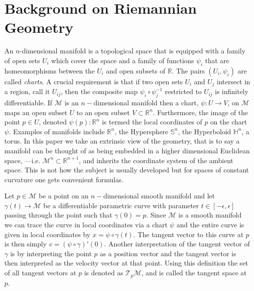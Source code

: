 \appendix
\onecolumn
\section{Background on Riemannian Geometry}
\label{riemannian_geometry_appendix}
An $n$-dimensional manifold is a topological space that is equipped with a family of open sets $U_i$ which cover the space and a family of functions $\psi_i$ that are homeomorphisms between the $U_i$ and open subsets of $\mathbb{R}$.  The pairs $(U_i,\psi_i)$ are called \emph{charts}.  A crucial requirement is that if two open sets $U_i$ and $U_j$ intersect in a region, call it $U_{ij}$, then the composite map $\psi_i\circ \psi_j^{-1}$ restricted to $U_{ij}$ is infinitely differentiable. If $\mathcal{M}$ is an $n-$dimensional manifold then a chart, $\psi: U \to V$, on $\mathcal{M}$ maps an open subset $U$ to an open subset $V \subset \mathbb{R}^n$. Furthermore, the image of the point $p \in U$, denoted $\psi(p) : \mathbb{R}^n$ is termed the local coordinates of $p$ on the chart $\psi$. Examples of manifolds include $\mathbb{R}^n$, the Hypersphere $\mathbb{S}^n$, the Hyperboloid $\mathbb{H}^n$, a torus. In this paper we take an extrinsic view of the geometry, that is to say a manifold can be thought of as being embedded in a higher dimensional Euclidean space, ---i.e. $\mathcal{M}^n \subset \mathbb{R}^{n+1}$, and inherits the coordinate system of the ambient space. This is not how the subject is usually developed but for spaces of constant curvature one gets convenient formulas.

 Let $p \in \mathcal{M}$ be a point on an $n-$dimensional smooth manifold and let $\gamma(t) \to \mathcal{M}$ be a differentiable parametric curve with parameter $t \in [-\epsilon, \epsilon]$ passing through the point such that $\gamma(0) = p$. Since $\mathcal{M}$ is a smooth manifold we can trace the curve in local coordinates via a chart $\psi$ and the entire curve is given in local coordinates by $x = \psi \circ \gamma(t)$. The tangent vector to this curve at $p$ is then simply $v = (\psi \circ \gamma)'(0)$. Another interpretation of the tangent vector of $\gamma$ is by interpreting the point $p$ as a position vector and the tangent vector is then interpreted as the velocity vector at that point. Using this definition the set of all tangent vectors at $p$ is denoted as $\mathcal{T}_p{\mathcal{M}}$, and is called the tangent space at $p$. 


